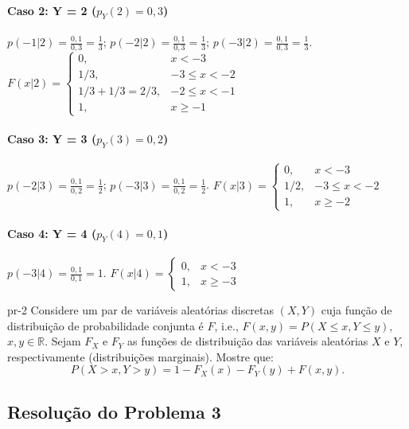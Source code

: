 \documentclass[
]{article}
\begin{document}
\paragraph{Caso 2: Y = 2 ($p_Y(2)=0,3$)}

\(p(-1|2)=\frac{0,1}{0,3}=\frac{1}{3}\);
\(p(-2|2)=\frac{0,1}{0,3}=\frac{1}{3}\);
\(p(-3|2)=\frac{0,1}{0,3}=\frac{1}{3}\). \(F(x|2) = \begin{cases}
0, & x < -3 \\ 1/3, & -3 \le x < -2 \\ 1/3+1/3=2/3, & -2 \le x < -1 \\ 1, & x \ge -1
\end{cases}\)

\paragraph{Caso 3: Y = 3 ($p_Y(3)=0,2$)}

\(p(-2|3)=\frac{0,1}{0,2}=\frac{1}{2}\);
\(p(-3|3)=\frac{0,1}{0,2}=\frac{1}{2}\). \(F(x|3) = \begin{cases}
0, & x < -3 \\ 1/2, & -3 \le x < -2 \\ 1, & x \ge -2
\end{cases}\)

\paragraph{Caso 4: Y = 4 ($p_Y(4)=0,1$)}

\(p(-3|4)=\frac{0,1}{0,1}=1\). \(F(x|4) = \begin{cases}
0, & x < -3 \\
1, & x \ge -3
\end{cases}\)

\newpage

\begin{problema}{}{pr-2}
    Considere um par de variáveis aleatórias discretas $(X, Y)$ cuja função de distribuição de probabilidade conjunta é $F$, i.e., $F(x,y)=P(X\leq x, Y\leq y),$ $x,y \in \mathbb{R}.$ Sejam $F_X$ e $F_Y$ as funções de distribuição das variáveis aleatórias $X$ e $Y,$ respectivamente (distribuições marginais). Mostre que: $$P(X>x, Y>y)= 1-F_X(x)-F_Y(y)+F(x,y).$$   
\end{problema}

\subsection*{Resolução do Problema 3}
\end{document}
